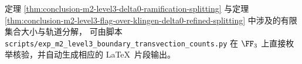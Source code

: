 



\begin{remark}[有限组合核验脚本]\label{rem:conclusion-m2-level3-boundary-transvection-audit-script}
定理 \ref{thm:conclusion-m2-level3-delta0-ramification-splitting} 与定理 \ref{thm:conclusion-m2-level3-flag-over-klingen-delta0-refined-splitting} 中涉及的有限集合大小与轨道分解，
可由脚本 \texttt{scripts/exp\_m2\_level3\_boundary\_transvection\_counts.py} 在 \(\FF_3\) 上直接枚举核验，并自动生成相应的 \LaTeX\ 片段输出。
\end{remark}

